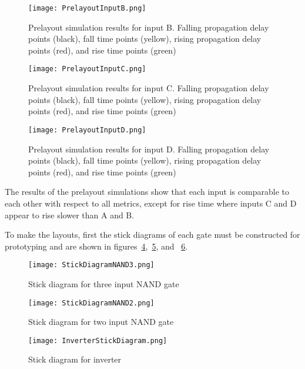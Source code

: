 \documentclass[conference]{IEEEtran}
\begin{document}
  \begin{figure}[H]
  \center
    \texttt{[image: PrelayoutInputB.png]}
    \caption{Prelayout simulation results for input B. Falling propagation delay points (black), fall time points (yellow), rising propagation delay points (red), and rise time points (green)}
    \label{fig:PreLayoutBResults}
  \end{figure} 

  \begin{figure}[H]
  \center
    \texttt{[image: PrelayoutInputC.png]}
    \caption{Prelayout simulation results for input C. Falling propagation delay points (black), fall time points (yellow), rising propagation delay points (red), and rise time points (green)}
    \label{fig:PreLayoutCResults}
  \end{figure} 

  \begin{figure}[H]
  \center
    \texttt{[image: PrelayoutInputD.png]}
    \caption{Prelayout simulation results for input D. Falling propagation delay points (black), fall time points (yellow), rising propagation delay points (red), and rise time points (green)}
    \label{fig:PreLayoutDResults}
  \end{figure} 

The results of the prelayout simulations show that each input is comparable to each other with respect to all metrics, except for rise time where inputs C and D appear to rise slower than A and B. 

To make the layouts, first the stick diagrams of each gate must be constructed for prototyping and are shown in figures~\ref{fig:NAND3Stick},~\ref{fig:NAND2Stick}, and ~\ref{fig:InverterStick}.


\begin{figure}[H]
  \center
    \texttt{[image: StickDiagramNAND3.png]}
    \caption{Stick diagram for three input NAND gate}
    \label{fig:NAND3Stick}
  \end{figure} 

  \begin{figure}[H]
  \center
    \texttt{[image: StickDiagramNAND2.png]}
    \caption{Stick diagram for two input NAND gate}
    \label{fig:NAND2Stick}
  \end{figure} 

\begin{figure}[H]
  \center
    \texttt{[image: InverterStickDiagram.png]}
    \caption{Stick diagram for inverter}
    \label{fig:InverterStick}
  \end{figure} 
\end{document}
